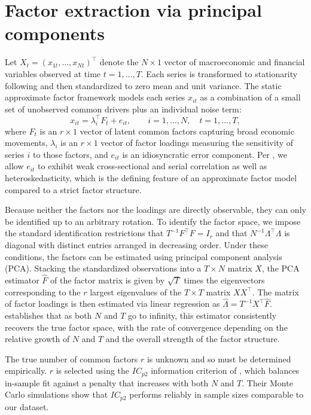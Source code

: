 \documentclass[12pt]{report} %
\begin{document}
\section{Factor extraction via principal components}
\label{sec:factors}

Let $X_t = (x_{1t}, \ldots, x_{Nt})^\top$ denote the $N \times 1$ vector of macroeconomic and financial variables observed at time $t = 1, \ldots, T$. Each series is transformed to stationarity following \textcite{mccracken2020fredqd} and then standardized to zero mean and unit variance. The static approximate factor framework models each series $x_{it}$ as a combination of a small set of unobserved common drivers plus an individual noise term:
\[
x_{it} = \lambda_i^\top F_t + e_{it}, \qquad i = 1, \ldots, N, \quad t = 1, \ldots, T,
\]
where $F_t$ is an $r \times 1$ vector of latent common factors capturing broad economic movements, $\lambda_i$ is an $r \times 1$ vector of factor loadings measuring the sensitivity of series $i$ to those factors, and $e_{it}$ is an idiosyncratic error component. Per \textcite{bai2002determining}, we allow $e_{it}$ to exhibit weak cross-sectional and serial correlation as well as heteroskedasticity, which is the defining feature of an approximate factor model compared to a strict factor structure.

Because neither the factors nor the loadings are directly observable, they can only be identified up to an arbitrary rotation. To identify the factor space, we impose the standard identification restrictions that $T^{-1} F^\top F = I_r$ and that $N^{-1} \Lambda^\top \Lambda$ is diagonal with distinct entries arranged in decreasing order. Under these conditions, the factors can be estimated using principal component analysis (PCA). Stacking the standardized observations into a $T \times N$ matrix $X$, the PCA estimator $\hat{F}$ of the factor matrix is given by $\sqrt{T}$ times the eigenvectors corresponding to the $r$ largest eigenvalues of the $T \times T$ matrix $X X^\top$. The matrix of factor loadings is then estimated via linear regression as $\hat{\Lambda} = T^{-1} X^\top \hat{F}$. \textcite{bai2003inferential} establishes that as both $N$ and $T$ go to infinity, this estimator consistently recovers the true factor space, with the rate of convergence depending on the relative growth of $N$ and $T$ and the overall strength of the factor structure.

The true number of common factors $r$ is unknown and so must be determined empirically. $r$ is selected using the $IC_{p2}$ information criterion of \textcite{bai2002determining}, which balances in-sample fit against a penalty that increases with both $N$ and $T$. Their Monte Carlo simulations show that $IC_{p2}$ performs reliably in sample sizes comparable to our dataset.
\end{document}
